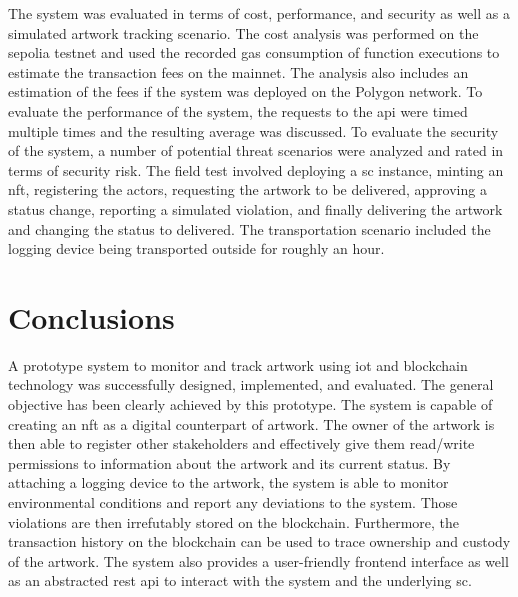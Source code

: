 The system was evaluated in terms of cost, performance, and security as well as a simulated artwork tracking scenario. The cost analysis was performed on the sepolia testnet and used the recorded gas consumption of function executions to estimate the transaction fees on the mainnet. The analysis also includes an estimation of the fees if the system was deployed on the Polygon network. To evaluate the performance of the system, the requests to the \gls{api} were timed multiple times and the resulting average was discussed. To evaluate the security of the system, a number of potential threat scenarios were analyzed and rated in terms of security risk.  The field test involved deploying a \gls{sc} instance, minting an \gls{nft}, registering the actors, requesting the artwork to be delivered, approving a status change, reporting a simulated violation, and finally delivering the artwork and changing the status to delivered. The transportation scenario included the logging device being transported outside for roughly an hour. 

\section{Conclusions}
A prototype system to monitor and track artwork using \gls{iot} and blockchain technology was successfully designed, implemented, and evaluated. The general objective has been clearly achieved by this prototype. The system is capable of creating an \gls{nft} as a digital counterpart of artwork. The owner of the artwork is then able to register other stakeholders and effectively give them read/write permissions to information about the artwork and its current status. By attaching a logging device to the artwork, the system is able to monitor environmental conditions and report any deviations to the system. Those violations are then irrefutably stored on the blockchain. Furthermore, the transaction history on the blockchain can be used to trace ownership and custody of the artwork. The system also provides a user-friendly frontend interface as well as an abstracted \gls{rest} \gls{api} to interact with the system and the underlying \gls{sc}.

